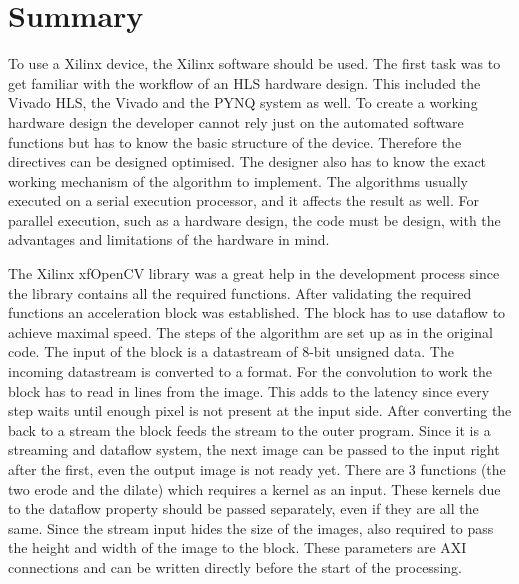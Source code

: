 \chapter{Summary} \label{ch:sum}

To use a Xilinx device, the Xilinx software should be used.
The first task was to get familiar with the workflow of an HLS hardware design.
This included the Vivado HLS, the Vivado and the PYNQ system as well.
To create a working hardware design the developer cannot rely just on the automated software functions but has to know the basic structure of the device.
Therefore the directives can be designed optimised.
The designer also has to know the exact working mechanism of the algorithm to implement.
The algorithms usually executed on a serial execution processor, and it affects the result as well.
For parallel execution, such as a hardware design, the code must be design, with the advantages and limitations of the hardware in mind.

The Xilinx xfOpenCV library was a great help in the development process since the library contains all the required functions.
After validating the required functions an acceleration block was established.
The block has to use dataflow to achieve maximal speed.
The steps of the algorithm are set up as in the original code.
The input of the block is a datastream of 8-bit unsigned data.
The incoming datastream is converted to a  format.
For the convolution to work the block has to read in  lines from the image.
This adds to the latency since every step waits until enough pixel is not present at the input side.
After converting the  back to a stream the block feeds the stream to the outer program.
Since it is a streaming and dataflow system, the next image can be passed to the input right after the first, even the output image is not ready yet.
There are 3 functions (the two erode and the dilate) which requires a kernel as an input.
These kernels due to the dataflow property should be passed separately, even if they are all the same.
Since the stream input hides the size of the images, also required to pass the height and width of the image to the block.
These parameters are AXI connections and can be written directly before the start of the processing.

